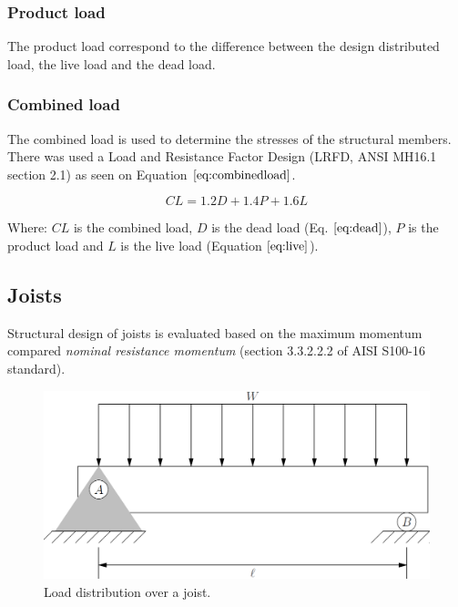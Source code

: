 \subsubsection{Product load}

The product load correspond to the difference between the design distributed load, the live load and the dead load.

\subsubsection{Combined load}

The combined load is used to determine the stresses of the structural members. There was used a Load and Resistance Factor Design (LRFD, ANSI MH16.1 section 2.1) as seen on Equation $\eqref{eq:combinedload}$.

\begin{equation}
    CL = 1.2 D + 1.4 P +1.6 L
    \label{eq:combinedload}
\end{equation}

Where: $CL$ is the combined load, $D$ is the dead load (Eq. $\eqref{eq:dead}$), $P$ is the product load and $L$ is the live load (Equation $\eqref{eq:live}$).

\subsection{Joists}

Structural design of joists is evaluated based on the maximum momentum compared \textit{nominal resistance momentum} (section 3.3.2.2.2 of AISI S100-16 standard).

\begin{figure}[h!]
\centering
\includegraphics[width=\textwidth]{Images/Calculus/Vigueta/Vigueta.PNG}
\caption{Load distribution over a joist.}
\label{distjoist}
\end{figure}

